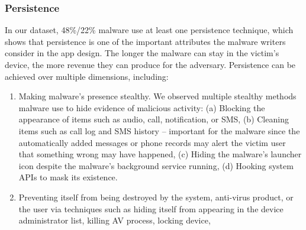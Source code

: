 \vspace{-.1in}
\subsubsection{Persistence}
\label{sec:profile:behavior:persistence}

In our dataset, 48\%/22\% malware use at least one
persistence technique, which shows that
persistence is one of the important attributes
the malware writers consider in the app design.
The longer the malware can stay in the victim's device,
the more revenue they can produce for the adversary.
Persistence can be achieved over multiple dimensions, including:

\begin{enumerate}[label=\alph*)]
\item Making malware's presence stealthy.
We observed multiple stealthy methods malware use to hide evidence of malicious activity:
(a) Blocking the appearance of items such as audio, call, notification, or SMS,
(b) Cleaning items such as call log and SMS history -- important for the malware since
the automatically added messages or phone records may alert the victim user that something wrong
may have happened,
(c) Hiding the malware's launcher icon despite the malware's background service running,
(d) Hooking system APIs to mask its existence.
\item Preventing itself from being destroyed by the system, anti-virus product, or the user via
techniques such as hiding itself from appearing in the device administrator list,
killing AV process, locking device, \etc
\end{enumerate}

